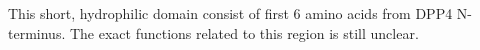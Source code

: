 
This short, hydrophilic domain consist of first 6 amino acids from DPP4 N-terminus. The exact functions related to this region is still unclear. 